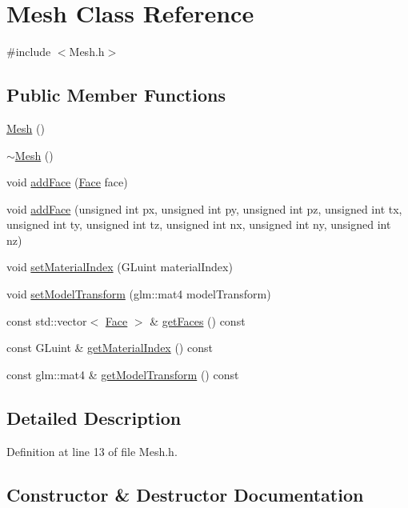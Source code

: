 \hypertarget{class_mesh}{}\section{Mesh Class Reference}
\label{class_mesh}


{\ttfamily \#include $<$Mesh.\+h$>$}

\subsection*{Public Member Functions}
\begin{DoxyCompactItemize}
\item 
\hyperlink{class_mesh_a2af137f1571af89172b9c102302c416b}{Mesh} ()
\item 
\hyperlink{class_mesh_a5efe4da1a4c0971cfb037bd70304c303}{$\sim$\+Mesh} ()
\item 
void \hyperlink{class_mesh_a2ee41f5ae475f12dfaf34a265bff32f9}{add\+Face} (\hyperlink{struct_face}{Face} face)
\item 
void \hyperlink{class_mesh_ac4ec839622d374b31839b143464a2896}{add\+Face} (unsigned int px, unsigned int py, unsigned int pz, unsigned int tx, unsigned int ty, unsigned int tz, unsigned int nx, unsigned int ny, unsigned int nz)
\item 
void \hyperlink{class_mesh_a9b777ec35644e1e96a6c70531b3cd329}{set\+Material\+Index} (G\+Luint material\+Index)
\item 
void \hyperlink{class_mesh_a252f28d8a9fa95ff952ae400cfa44486}{set\+Model\+Transform} (glm\+::mat4 model\+Transform)
\item 
const std\+::vector$<$ \hyperlink{struct_face}{Face} $>$ \& \hyperlink{class_mesh_ad356c83c10098f1d92e7e0ed4c7a32e6}{get\+Faces} () const
\item 
const G\+Luint \& \hyperlink{class_mesh_a230c556491bb5d905147159b6a367b9d}{get\+Material\+Index} () const
\item 
const glm\+::mat4 \& \hyperlink{class_mesh_a77e5abe38ca6e9f4b7949d84cb5735a0}{get\+Model\+Transform} () const
\end{DoxyCompactItemize}


\subsection{Detailed Description}


Definition at line 13 of file Mesh.\+h.



\subsection{Constructor \& Destructor Documentation}
\mbox{\label{class_mesh_a2af137f1571af89172b9c102302c416b}} 
